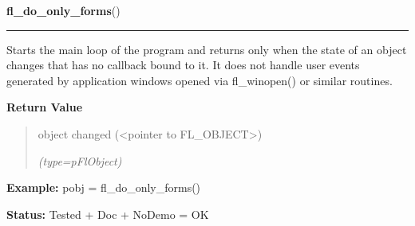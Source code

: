 \hspace{.8\funcindent}\begin{boxedminipage}{\funcwidth}

    \raggedright \textbf{fl\_do\_only\_forms}()

    \vspace{-1.5ex}

    \rule{\textwidth}{0.5\fboxrule}
\setlength{\parskip}{2ex}
    Starts the main loop of the program and returns only when the state of 
    an object changes that has no callback bound to it. It does not handle 
    user events generated by application windows opened via fl\_winopen() 
    or similar routines.

\setlength{\parskip}{1ex}
      \textbf{Return Value}
    \vspace{-1ex}

      \begin{quote}
      object changed ({\textless}pointer to FL\_OBJECT{\textgreater})

      {\it (type=pFlObject)}

      \end{quote}

\textbf{Example:} pobj = fl\_do\_only\_forms()



\textbf{Status:} Tested + Doc + NoDemo = OK



    \end{boxedminipage}

    \label{xformslib:flbasic:fl_check_only_forms}

    \vspace{0.5ex}

